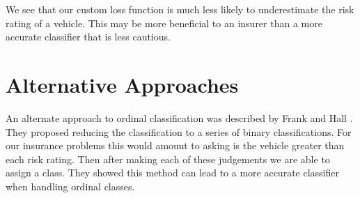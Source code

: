 We see that our custom loss function is much less likely to underestimate the risk rating of a vehicle.
This may be more beneficial to an insurer than a more accurate classifier that is less cautious.

\section{Alternative Approaches}

An alternate approach to ordinal classification was described by Frank and Hall \cite{Frank01}.
They proposed reducing the classification to a series of binary classifications.
For our insurance problems this would amount to asking is the vehicle greater than each risk rating.
Then after making each of these judgements we are able to assign a class.
They showed this method can lead to a more accurate classifier when handling ordinal classes.